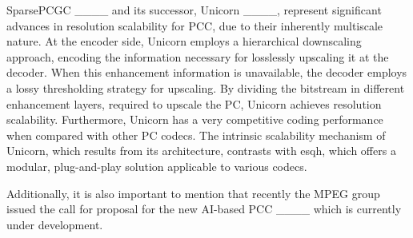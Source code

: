 SparsePCGC ____ and its successor, Unicorn ____, represent significant advances in resolution scalability for PCC, due to their inherently multiscale nature. At the encoder side, Unicorn employs a hierarchical downscaling approach, encoding the information necessary for losslessly upscaling it at the decoder.
When this enhancement information is unavailable, the decoder employs a lossy thresholding strategy for upscaling.
By dividing the bitstream in different enhancement layers, required to upscale the PC, Unicorn achieves resolution scalability. Furthermore, Unicorn has a very competitive coding performance when compared with other PC codecs. The intrinsic scalability mechanism of Unicorn, which results from its architecture, contrasts with \gls{esqh}, which offers a modular, plug-and-play solution applicable to various codecs.

Additionally, it is also important to mention that recently the MPEG group issued the call for proposal for the new AI-based PCC ____ which is currently under development.